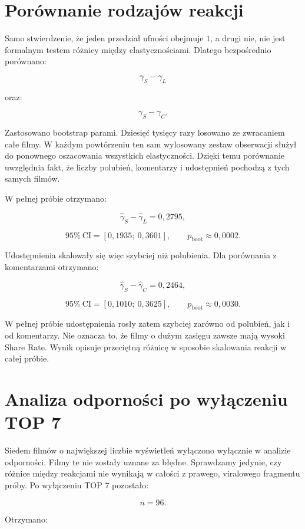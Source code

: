 \documentclass[12pt,a4paper]{article}
\begin{document}
\section{Porównanie rodzajów reakcji}

Samo stwierdzenie, że jeden przedział ufności obejmuje $1$, a drugi nie, nie jest formalnym testem różnicy między elastycznościami. Dlatego bezpośrednio porównano:

\[
\gamma_{S}-\gamma_{L}
\]

oraz:

\[
\gamma_{S}-\gamma_{C}.
\]

Zastosowano bootstrap parami. Dziesięć tysięcy razy losowano ze zwracaniem całe filmy. W każdym powtórzeniu ten sam wylosowany zestaw obserwacji służył do ponownego oszacowania wszystkich elastyczności. Dzięki temu porównanie uwzględnia fakt, że liczby polubień, komentarzy i udostępnień pochodzą z tych samych filmów.

W pełnej próbie otrzymano:

\[
\widehat{\gamma}_{S}-\widehat{\gamma}_{L}
=0{,}2795,
\]

\[
95\%\ \mathrm{CI}=[0{,}1935;\ 0{,}3601],
\qquad
p_{\mathrm{boot}}\approx0{,}0002.
\]

Udostępnienia skalowały się więc szybciej niż polubienia. Dla porównania z komentarzami otrzymano:

\[
\widehat{\gamma}_{S}-\widehat{\gamma}_{C}
=0{,}2464,
\]

\[
95\%\ \mathrm{CI}=[0{,}1010;\ 0{,}3625],
\qquad
p_{\mathrm{boot}}\approx0{,}0030.
\]

W pełnej próbie udostępnienia rosły zatem szybciej zarówno od polubień, jak i od komentarzy. Nie oznacza to, że filmy o dużym zasięgu zawsze mają wysoki Share Rate. Wynik opisuje przeciętną różnicę w sposobie skalowania reakcji w całej próbie.

\section{Analiza odporności po wyłączeniu TOP 7}

Siedem filmów o największej liczbie wyświetleń wyłączono wyłącznie w analizie odporności. Filmy te nie zostały uznane za błędne. Sprawdzamy jedynie, czy różnice między reakcjami nie wynikają w całości z prawego, viralowego fragmentu próby. Po wyłączeniu TOP 7 pozostało:

\[
n=96.
\]

Otrzymano:
\end{document}
